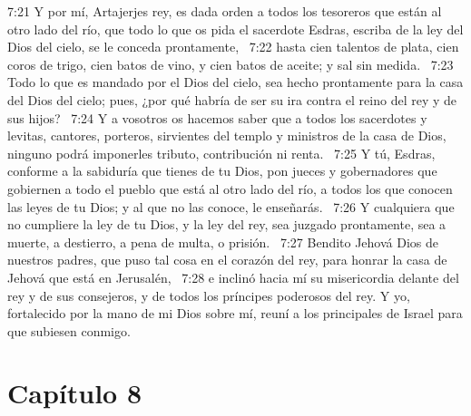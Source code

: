 7:21 Y por mí, Artajerjes rey, es dada orden a todos los tesoreros que están al otro lado del río, que todo lo que os pida el sacerdote Esdras, escriba de la ley del Dios del cielo, se le conceda prontamente,  
7:22 hasta cien talentos de plata, cien coros de trigo, cien batos de vino, y cien batos de aceite; y sal sin medida.  
7:23 Todo lo que es mandado por el Dios del cielo, sea hecho prontamente para la casa del Dios del cielo; pues, ¿por qué habría de ser su ira contra el reino del rey y de sus hijos?  
7:24 Y a vosotros os hacemos saber que a todos los sacerdotes y levitas, cantores, porteros, sirvientes del templo y ministros de la casa de Dios, ninguno podrá imponerles tributo, contribución ni renta.  
7:25 Y tú, Esdras, conforme a la sabiduría que tienes de tu Dios, pon jueces y gobernadores que gobiernen a todo el pueblo que está al otro lado del río, a todos los que conocen las leyes de tu Dios; y al que no las conoce, le enseñarás.  
7:26 Y cualquiera que no cumpliere la ley de tu Dios, y la ley del rey, sea juzgado prontamente, sea a muerte, a destierro, a pena de multa, o prisión.  
7:27 Bendito Jehová Dios de nuestros padres, que puso tal cosa en el corazón del rey, para honrar la casa de Jehová que está en Jerusalén,  
7:28 e inclinó hacia mí su misericordia delante del rey y de sus consejeros, y de todos los príncipes poderosos del rey. Y yo, fortalecido por la mano de mi Dios sobre mí, reuní a los principales de Israel para que subiesen conmigo. 
\section*{Capítulo 8}

